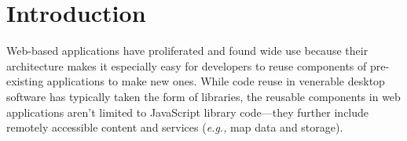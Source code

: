 \section{Introduction}
\label{sec:intro}

Web-based applications have proliferated and found wide use because
their architecture makes it especially easy for developers to reuse
components of pre-existing applications to make new ones. While code
reuse in venerable desktop software has typically taken the form of
libraries, the reusable components in web applications aren't limited
to JavaScript library code---they further include remotely accessible
content and services ({\em e.g.,} map data and storage).



